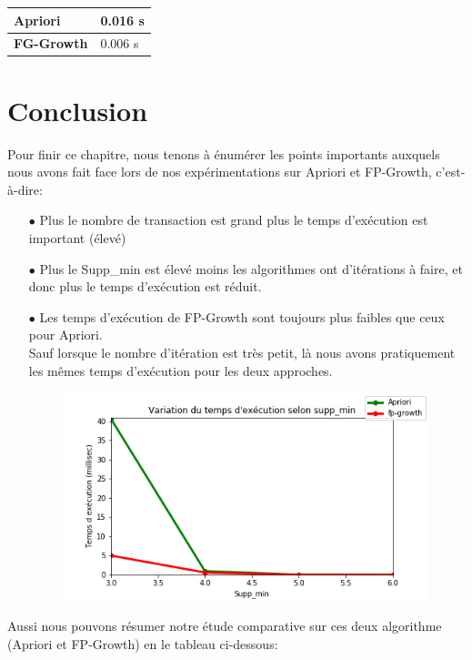 \documentclass[12pt,a4paper,oneside]{book}
\begin{document}
	
	\begin{center}
		\begin{tabular}{|p{5cm}|p{5cm}|}
			\hline
			\textbf{Apriori} &
			0.016 s
			\\
			\hline
			
			\textbf{FG-Growth} 
			&
			\textbf{ }%
			0.006 s
			\\
			\hline
			
		\end{tabular} 
	\end{center}
	
	
	\vspace{2cm}
	\section{Conclusion}
	Pour finir ce chapitre, nous tenons à énumérer les points importants auxquels nous avons fait face lors de nos expérimentations sur Apriori et FP-Growth, c'est-à-dire:
	\begin{itemize}
		\item[$\bullet$] Plus le nombre de transaction est grand plus le temps d'exécution est important (élevé)
		\item[$\bullet$] Plus le Supp\_min est élevé moins les algorithmes ont d'itérations à faire, et donc plus le temps d'exécution est réduit.
		\item[$\bullet$] Les temps d'exécution de FP-Growth sont toujours plus faibles que ceux pour Apriori.\\
		
		Sauf lorsque le nombre d'itération est très petit, là nous avons pratiquement les mêmes temps d'exécution pour les deux approches.
		
		\begin{figure}[H]
			\centering
			\includegraphics[scale=0.8]{image/ApFpPlot.png}
			\label{labelname}%
		\end{figure}
	\end{itemize}
	Aussi nous pouvons résumer notre étude comparative sur ces deux algorithme (Apriori et FP-Growth) en le tableau ci-dessous:
	
\end{document}
